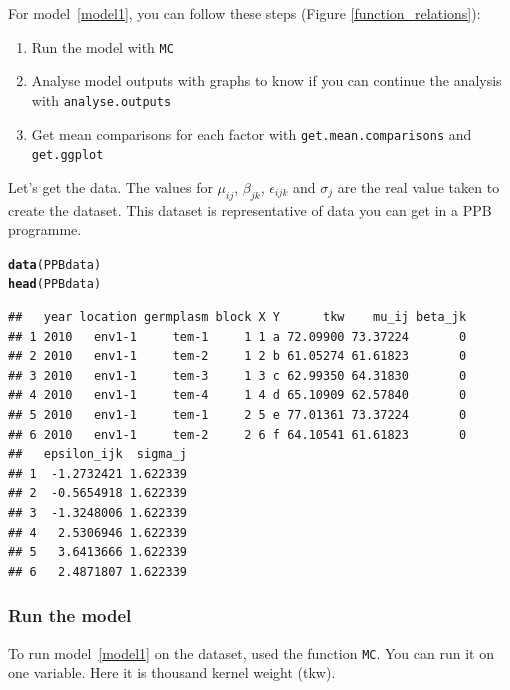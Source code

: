 \documentclass{article}\usepackage[]{graphicx}\usepackage[]{color}
\makeatletter
\newcommand{\hlstd}[1]{\textcolor[rgb]{0.345,0.345,0.345}{#1}}%
\newcommand{\hlkwd}[1]{\textcolor[rgb]{0.737,0.353,0.396}{\textbf{#1}}}%
\newenvironment{kframe}{%
 \def\at@end@of@kframe{}%
 \ifinner\ifhmode%
  \def\at@end@of@kframe{\end{minipage}}%
  \begin{minipage}{\columnwidth}%
 \fi\fi%
 \def\FrameCommand##1{\hskip\@totalleftmargin \hskip-\fboxsep
 \colorbox{shadecolor}{##1}\hskip-\fboxsep
     \hskip-\linewidth \hskip-\@totalleftmargin \hskip\columnwidth}%
 \MakeFramed {\advance\hsize-\width
   \@totalleftmargin\z@ \linewidth\hsize
   \@setminipage}}%
 {\par\unskip\endMakeFramed%
 \at@end@of@kframe}
\newenvironment{knitrout}{}{} %
\makeatother
\begin{document}
For model~\ref{model1}, you can follow these steps (Figure \ref{function_relations}):

\begin{enumerate}
\item Run the model with \texttt{MC}
\item Analyse model outputs with graphs to know if you can continue the analysis with \texttt{analyse.outputs}
\item Get mean comparisons for each factor with \texttt{get.mean.comparisons} and \texttt{get.ggplot}
\end{enumerate}



Let's get the data.
The values for $\mu_{ij}$, $\beta_{jk}$, $\epsilon_{ijk}$ and $\sigma_j$ are the real value taken to create the dataset.
This dataset is representative of data you can get in a PPB programme.

\begin{knitrout}
\color{fgcolor}\begin{kframe}
\begin{alltt}
\hlkwd{data}\hlstd{(PPBdata)}
\hlkwd{head}\hlstd{(PPBdata)}
\end{alltt}
\begin{verbatim}
##   year location germplasm block X Y      tkw    mu_ij beta_jk
## 1 2010   env1-1     tem-1     1 1 a 72.09900 73.37224       0
## 2 2010   env1-1     tem-2     1 2 b 61.05274 61.61823       0
## 3 2010   env1-1     tem-3     1 3 c 62.99350 64.31830       0
## 4 2010   env1-1     tem-4     1 4 d 65.10909 62.57840       0
## 5 2010   env1-1     tem-1     2 5 e 77.01361 73.37224       0
## 6 2010   env1-1     tem-2     2 6 f 64.10541 61.61823       0
##   epsilon_ijk  sigma_j
## 1  -1.2732421 1.622339
## 2  -0.5654918 1.622339
## 3  -1.3248006 1.622339
## 4   2.5306946 1.622339
## 5   3.6413666 1.622339
## 6   2.4871807 1.622339
\end{verbatim}
\end{kframe}
\end{knitrout}

\subsubsection{Run the model}

To run model~\ref{model1} on the dataset, used the function \texttt{MC}.
You can run it on one variable.
Here it is thousand kernel weight (tkw).
\end{document}

